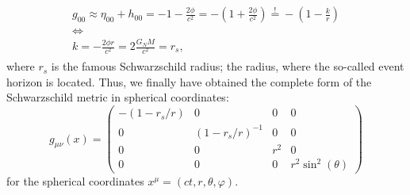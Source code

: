 \documentclass[a4paper,11pt]{article}
\numberwithin{equation}{section}
\begin{document}
{\begin{gather}
\begin{gathered}
	g_{00} \approx \eta_{00} + h_{00} = -1 - \frac{2\phi}{c^2} = -\left(1 + \frac{2\phi}{c^2}\right) \overset{!}{=} -\left(1-\frac{k}{r}\right) \\ \Leftrightarrow \\ k = -\frac{2\phi r}{c^2} = 2\frac{G_N M}{c^2} = r_s,
\end{gathered}\end{gather} where $r_s$ is the famous Schwarzschild radius; the radius, where the so-called event horizon is located. Thus, we finally have obtained the complete form of the Schwarzschild metric in spherical coordinates:
\begin{equation}
	g_{\mu\nu}(x) = \begin{pmatrix}
		-(1-r_s/r) & 0 & 0 & 0 \\
		0 & (1-r_s/r)^{-1} & 0 & 0 \\
		0 & 0 & r^2 & 0 \\
		0 & 0 & 0 & r^2\sin^2(\theta)
	\end{pmatrix}
\end{equation} for the spherical coordinates $x^\mu = (ct, r, \theta,\varphi)$. 
}

%
%

\end{document}

